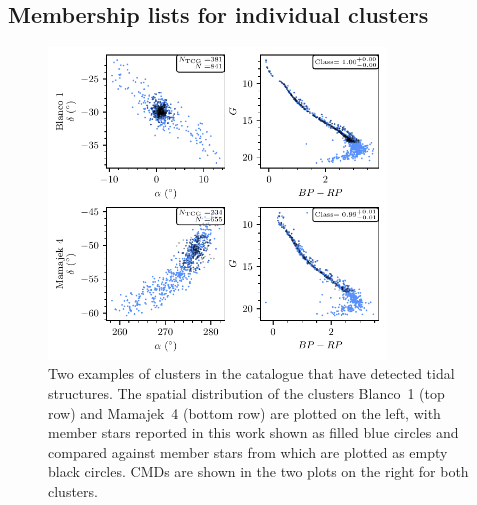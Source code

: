 

\subsection{Membership lists for individual clusters}



\begin{figure}[t]
   \centering
   \includegraphics[width=0.8\textwidth]{fig/c3/fig_results_tidal_tails.pdf}
   \caption[Two examples of clusters in the catalogue that have detected tidal structures]{Two examples of clusters in the catalogue that have detected tidal structures. The spatial distribution of the clusters Blanco~1 (top row) and Mamajek~4 (bottom row) are plotted on the left, with member stars reported in this work shown as filled blue circles and compared against member stars from \cite{cantat-gaudin_clusters_2020} which are plotted as empty black circles. CMDs are shown in the two plots on the right for both clusters.}%
   \label{c3:fig:example_cluster_ra_dec}
\end{figure}

